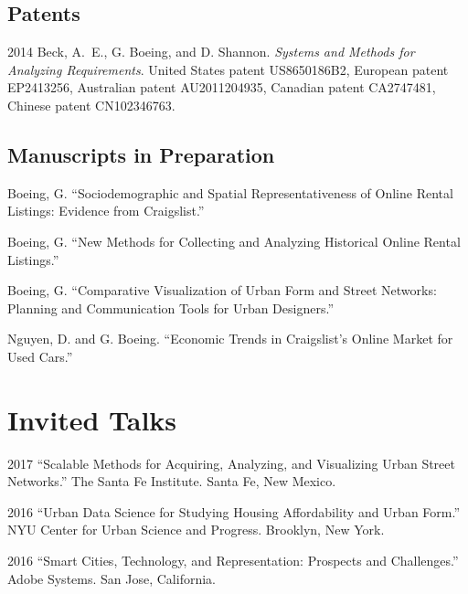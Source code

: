 \documentclass{academiccv}
\begin{document}
\subsection*{Patents}

\begin{tablist}

\item[2014] \tab Beck, A.~E., G. Boeing, and D. Shannon. \emph{Systems and Methods for Analyzing Requirements}. United States patent US8650186B2, European patent EP2413256, Australian patent AU2011204935, Canadian patent CA2747481, Chinese patent CN102346763.

\end{tablist}



\subsection*{Manuscripts in Preparation}

\begin{tablist}

\item[\the\year] \tab Boeing, G. \enquote{Sociodemographic and Spatial Representativeness of Online Rental Listings: Evidence from Craigslist.}

\item[\the\year] \tab Boeing, G. \enquote{New Methods for Collecting and Analyzing Historical Online Rental Listings.}

\item[\the\year] \tab Boeing, G. \enquote{Comparative Visualization of Urban Form and Street Networks: Planning and Communication Tools for Urban Designers.}

\item[\the\year] \tab Nguyen, D. and G. Boeing. \enquote{Economic Trends in Craigslist's Online Market for Used Cars.}

\end{tablist}



\section*{Invited Talks}

\begin{tablist}

\item[2017] \tab \enquote{Scalable Methods for Acquiring, Analyzing, and Visualizing Urban Street Networks.} The Santa Fe Institute. Santa Fe, New Mexico.

\item[2016] \tab \enquote{Urban Data Science for Studying Housing Affordability and Urban Form.} NYU Center for Urban Science and Progress. Brooklyn, New York.

\item[2016] \tab \enquote{Smart Cities, Technology, and Representation: Prospects and Challenges.} Adobe Systems. San Jose, California.

\end{tablist}
\end{document}
